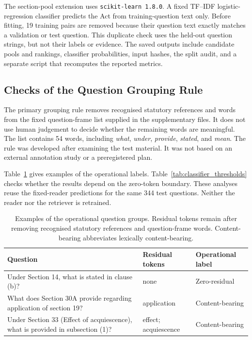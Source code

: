 \documentclass[pdflatex,sn-basic]{sn-jnl}%
\theoremstyle{thmstyleone}%
\theoremstyle{thmstyletwo}%
\theoremstyle{thmstylethree}%
\begin{document}
The section-pool extension uses \texttt{scikit-learn 1.8.0}. A fixed TF--IDF
logistic-regression classifier predicts the Act from training-question text
only. Before fitting, 19 training pairs are removed because their question
text exactly matches a validation or test question. This duplicate check uses
the held-out question strings, but not their labels or evidence. The saved
outputs include candidate pools and rankings, classifier probabilities, input
hashes, the split audit, and a separate script that recomputes the reported
metrics.

\subsection{Checks of the Question Grouping Rule}
\label{sec:classifier_robustness}

The primary grouping rule removes recognised statutory references and words
from the fixed question-frame list supplied in the supplementary files. It
does not use human judgement to decide whether the remaining words are
meaningful. The list contains 54 words, including \emph{what}, \emph{under},
\emph{provide}, \emph{stated}, and \emph{mean}. The rule was developed after
examining the test material. It was not based on an external annotation study
or a preregistered plan.

Table~\ref{tab:classifier_examples} gives examples of the operational labels.
Table~\ref{tab:classifier_thresholds} checks whether the results depend on the
zero-token boundary. These analyses reuse the fixed-reader predictions for the
same 344 test questions. Neither the reader nor the retriever is retrained.

\begin{table}[!htbp]
    \caption{Examples of the operational question groups. Residual tokens
    remain after removing recognised statutory references and question-frame
    words. Content-bearing abbreviates lexically content-bearing.}
    \label{tab:classifier_examples}
    \centering
    \scriptsize
    \setlength{\tabcolsep}{3.5pt}
    \begin{tabular}{@{}p{7.3cm}p{2.4cm}p{2.2cm}@{}}
        \toprule
        Question & Residual tokens & Operational label \\
        \midrule
        Under Section 14, what is stated in clause (b)?
        & none & Zero-residual \\

        What does Section 30A provide regarding application of section 19?
        & application & Content-bearing \\

        Under Section 33 (Effect of acquiescence), what is provided in
        subsection (1)?
        & effect; acquiescence & Content-bearing \\
        \bottomrule
    \end{tabular}
\end{table}
\end{document}
